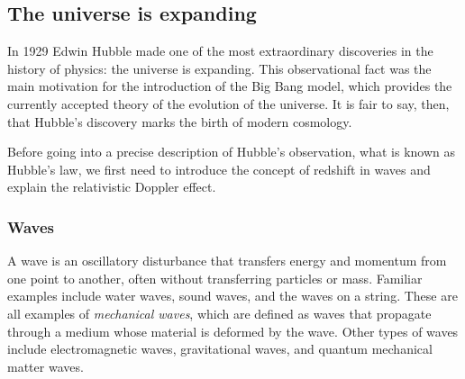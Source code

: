 \subsection{The universe is expanding}

In 1929 Edwin Hubble made one of the most extraordinary discoveries in the history of physics: the universe is expanding. This observational fact was the main motivation for the introduction of the Big Bang model, which provides the currently accepted theory of the evolution of the universe. It is fair to say, then, that Hubble's discovery marks the birth of modern cosmology.

Before going into a precise description of Hubble's observation, what is known as Hubble's law, we first need to introduce the concept of redshift in waves and explain the relativistic Doppler effect.

\subsubsection{Waves}

A wave is an oscillatory disturbance that transfers energy and momentum from one point to another, often without transferring particles or mass. Familiar examples include water waves, sound waves, and the waves on a string. These are all examples of {\it mechanical waves}, which are defined as waves that propagate through a medium whose material is deformed by the wave. Other types of waves include electromagnetic waves, gravitational waves, and quantum mechanical matter waves.

